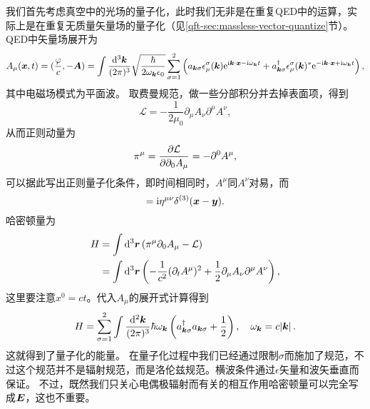 我们首先考虑真空中的光场的量子化，此时我们无非是在重复QED中的运算，实际上是在重复无质量矢量场的量子化（见\ref{qft-sec:massless-vector-quantize}节）。
QED中矢量场展开为
\begin{equation}
    A_\mu(\vb*{x}, t) = (\frac{\varphi}{c}, - \vb*{A}) = \int \frac{\dd[3]{\vb*{k}}}{(2\pi)^3} \sqrt{\frac{\hbar}{2\omega_{\vb*{k}} \epsilon_0}} \sum_{\sigma=1}^2 \left( a_{\vb*{k} \sigma} \epsilon_\mu^\sigma(\vb*{k}) \mathrm{e}^{\mathrm{i} \vb*{k} \cdot \vb*{x} - \mathrm{i} \omega_{\vb*{k}} t} + a_{\vb*{k} \sigma}^\dagger \epsilon_\mu^\sigma(\vb*{k})^* \mathrm{e}^{- \mathrm{i} \vb*{k} \cdot \vb*{x} + \mathrm{i} \omega_{\vb*{k}} t} \right),
    \label{eq:vector-field-components}
\end{equation}
其中电磁场模式为平面波。
取费曼规范，做一些分部积分并去掉表面项，得到
\begin{equation}
    \mathcal{L} = - \frac{1}{2 \mu_0} \partial_\mu A_\nu \partial^\mu A^\nu,
\end{equation}
从而正则动量为
\begin{equation}
    \pi^\mu = \pdv{\mathcal{L}}{\partial_0 A_\mu} = - \partial^0 A^\mu,
\end{equation}
可以据此写出正则量子化条件，即时间相同时，$A^\mu$同$A^\nu$对易，而
\begin{equation}
    [A^\mu(\vb*{x}, t), \pi^\mu(\vb*{y}, t)] = \ii \eta^{\mu \nu} \delta^{(3)}(\vb*{x} - \vb*{y}).
\end{equation}
哈密顿量为
\[
    \begin{aligned}
        H &= \int \dd[3]{\vb*{r}} (\pi^\mu \partial_0 A_\mu - \mathcal{L}) \\
        &= \int \dd[3]{\vb*{r}} \left( - \frac{1}{c^2} (\partial_t A^\mu)^2 + \frac{1}{2} \partial_\mu A_\nu \partial^\mu A^\nu \right),
    \end{aligned}
\]
这里要注意$x^0 = c t$。代入$A_\mu$的展开式计算得到
\begin{equation}
    H = \sum_{\sigma=1}^2 \int \frac{\dd[2]{\vb*{k}}}{(2\pi)^3} \hbar \omega_{\vb*{k}} \left( a^\dagger_{\vb*{k} \sigma} a_{\vb*{k} \sigma} + \frac{1}{2} \right), \quad \omega_{\vb*{k}} = c \abs*{\vb*{k}}.
\end{equation}
这就得到了量子化的能量。
在量子化过程中我们已经通过限制$\sigma$而施加了规范，不过这个规范并不是辐射规范，而是洛伦兹规范。横波条件通过$\epsilon$矢量和波矢垂直而保证。
不过，既然我们只关心电偶极辐射而有关的相互作用哈密顿量可以完全写成$\vb*{E}$，这也不重要。

